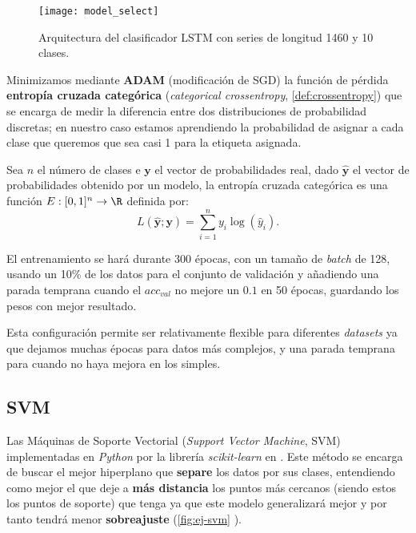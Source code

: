 \begin{figure}[htbp]
  \centering
  \texttt{[image: model\_select]}
  \caption{Arquitectura del clasificador LSTM con series de longitud 1460 y 10 clases.}
  \label{fig:model-select}
\end{figure}

Minimizamos mediante \textbf{ADAM} (modificación de SGD) la función de pérdida \textbf{entropía cruzada categórica} (\emph{categorical crossentropy}, \autoref{def:crossentropy}) que se encarga de medir la diferencia entre dos distribuciones de probabilidad discretas; en nuestro caso estamos aprendiendo la probabilidad de asignar a cada clase que queremos que sea casi 1 para la etiqueta asignada.

\begin{definicion}
  Sea $n$ el número de clases e $\textbf{y}$ el vector de probabilidades real, dado $\hat{\textbf{y}}$ el vector de probabilidades obtenido por un modelo, la entropía cruzada categórica es una función $E : [0, 1]^n \to \R$ definida por:
  $$ L(\hat{\textbf{y}} ; \textbf{y}) = \sum \limits^n_{i = 1} y_i \log(\hat{y}_i).$$
  \label{def:crossentropy}
\end{definicion}

El entrenamiento se hará durante 300 épocas, con un tamaño de \emph{batch} de 128, usando un 10\% de los datos para el conjunto de validación y añadiendo una parada temprana cuando el $acc_{val}$ no mejore un $0.1$ en 50 épocas, guardando los pesos con mejor resultado.

Esta configuración permite ser relativamente flexible para diferentes \emph{datasets} ya que dejamos muchas épocas para datos más complejos, y una parada temprana para cuando no haya mejora en los simples.

\subsection{SVM}

Las Máquinas de Soporte Vectorial (\emph{Support Vector Machine}, SVM) \cite{cortes1995support} implementadas en \emph{Python} por la librería \emph{scikit-learn} en \cite{scikit2020svm}. Este método se encarga de buscar el mejor hiperplano que \textbf{separe} los datos por sus clases, entendiendo como mejor el que deje a \textbf{más distancia} los puntos más cercanos (siendo estos los puntos de soporte) que tenga ya que este modelo generalizará mejor y por tanto tendrá menor \textbf{sobreajuste} (\autoref{fig:ej-svm} \cite{JavaTpointSVM}).

